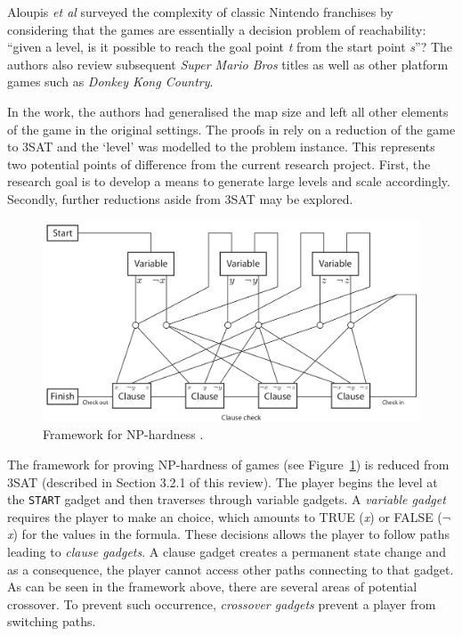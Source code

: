 \documentclass[11pt, a4paper, oneside]{report} %
\begin{document}
Aloupis \textit{et al} \cite{Aloupis2012} surveyed the complexity of classic
Nintendo franchises by considering that the games are essentially a decision
problem of reachability: ``given a level, is it possible to reach the goal point
\textit{t} from the start point \textit{s}''? The authors also review subsequent
\textit{Super Mario Bros} titles as well as other platform games such as
\textit{Donkey Kong Country}.

In the work, the authors had generalised the map size and left all other
elements of the game in the original settings. The proofs in \cite{Aloupis2012}
rely on a reduction of the game to 3SAT and the `level' was modelled to the
problem instance. This represents two potential points of difference from the
current research project. First, the research goal is to develop a means to
generate large levels and scale accordingly. Secondly, further reductions aside
from 3SAT may be explored.  \\

\begin{figure}[h!]

  \centering
    \includegraphics[scale=0.35]{aloupis_nphardness}
  \caption{Framework for NP-hardness \cite{Aloupis2012}.}
  \label{NP_hard}
\end{figure}

The framework for proving NP-hardness of games (see Figure~\ref{NP_hard}) is
reduced from 3SAT (described in Section 3.2.1 of this review). The player begins
the level at the \texttt{START} gadget and then traverses through variable
gadgets. A \textit{variable gadget} requires the player to make an choice, which
amounts to TRUE (\textit{x}) or FALSE (\( \neg \)\textit{x}) for the values in
the formula. These decisions allows the player to follow paths leading to
\textit{clause gadgets}. A clause gadget creates a permanent state change and as
a consequence, the player cannot access other paths connecting to that gadget.
As can be seen in the framework above, there are several areas of potential
crossover. To prevent such occurrence, \textit{crossover gadgets} prevent a
player from switching paths.
\end{document}
